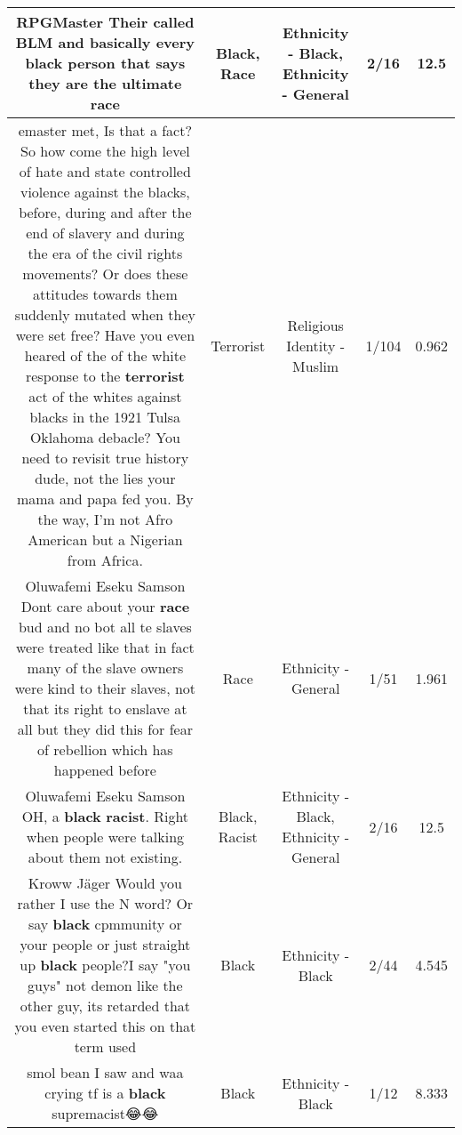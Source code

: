 \documentclass[11pt]{article}
\newlength\mylength
\begin{document}
\begin{center}
\begin{longtable}{|C{.65\mylength}|C{.30\mylength}|C{.12\mylength}|C{.12\mylength}|C{.12\mylength}|}
  \small RPGMaster Their called BLM and basically every \textbf{black} person that says they are the ultimate race\normalsize   & Black, Race & Ethnicity - Black, Ethnicity - General & 2/16 & 12.5 \\  \hline
  \small emaster met, Is that a fact? So how come the high level of hate and state controlled violence against the blacks, before, during and after the end of slavery and during the era of the civil rights movements? Or does these attitudes towards them suddenly mutated when they were set free? Have you even heared of the of the white response to the \textbf{terrorist} act of the whites against blacks in the 1921 Tulsa Oklahoma debacle? You need to revisit true history dude, not the lies your mama and papa fed you. By the way, I'm not Afro American but a Nigerian from Africa.\normalsize   & Terrorist & Religious Identity - Muslim & 1/104 & 0.962 \\  \hline
  \small Oluwafemi Eseku Samson Dont care about your \textbf{race} bud and no bot all te slaves were treated like that in fact many of the slave owners were kind to their slaves, not that its right to enslave at all but they did this for fear of rebellion which has happened before\normalsize   & Race & Ethnicity - General & 1/51 & 1.961 \\  \hline
  \small Oluwafemi Eseku Samson OH, a \textbf{black} \textbf{racist}. Right when people were talking about them not existing.\normalsize   & Black, Racist & Ethnicity - Black, Ethnicity - General & 2/16 & 12.5 \\  \hline
  \small Kroww Jäger Would you rather I use the N word? Or say \textbf{black} cpmmunity or your people or just straight up \textbf{black} people?I say "you guys" not demon like the other guy, its retarded that you even started this on that term used\normalsize   & Black & Ethnicity - Black & 2/44 & 4.545 \\  \hline
  \small smol bean I saw and waa crying tf is a \textbf{black} supremacist😂😂\normalsize   & Black & Ethnicity - Black & 1/12 & 8.333 \\  \hline

\end{longtable}
\end{center}
\end{document}
